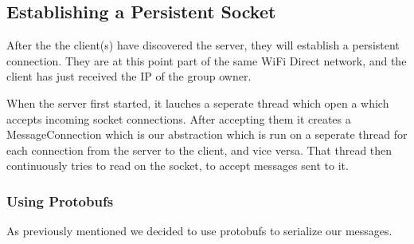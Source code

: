 \subsection{Establishing a Persistent Socket}

After the the client(s) have discovered the server, they will establish a persistent connection.
They are at this point part of the same WiFi Direct network, and the client has just received the IP of the group owner.

When the server first started, it lauches a seperate thread which open a  which accepts incoming socket connections.
After accepting them it creates a MessageConnection which is our abstraction which is run on a seperate thread for each connection from the server to the client, and vice versa.
That thread then continuously tries to read on the socket, to accept messages sent to it.

\subsubsection*{Using Protobufs}
As previously mentioned we decided to use protobufs to serialize our messages.

